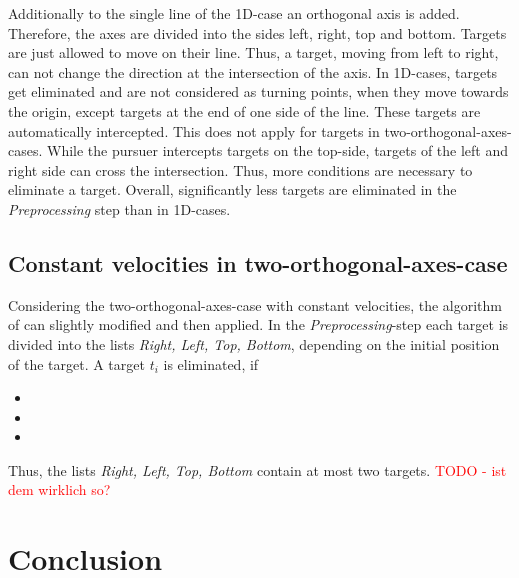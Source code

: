 \documentclass[english,version-2019-07]{uzl-thesis}
\begin{document}
Additionally to the single line of the 1D-case an orthogonal axis is added. Therefore, the axes are divided into the sides left, right, top and bottom. Targets are just allowed to move on their line. Thus, a target, moving from left to right, can not change the direction at the intersection of the axis. In 1D-cases, targets get eliminated and are not considered as turning points, when they move towards the origin, except targets at the end of one side of the line. These targets are automatically intercepted. This does not apply for targets in two-orthogonal-axes-cases. While the pursuer intercepts targets on the top-side, targets of the left and right side can cross the intersection. Thus, more conditions are necessary to eliminate a target. Overall, significantly less targets are eliminated in the \emph{Preprocessing} step than in 1D-cases.

\section{Constant velocities in two-orthogonal-axes-case}

Considering the two-orthogonal-axes-case with constant velocities, the algorithm of \cite{helvig} can slightly modified and then applied. In the \emph{Preprocessing}-step each target is divided into the lists \emph{Right, Left, Top, Bottom}, depending on the initial position of the target. A target $t_i$ is eliminated, if
\begin{itemize}
\item

\item

\item

\end{itemize}


Thus, the lists \emph{Right, Left, Top, Bottom} contain at most two targets. 
\textcolor{red}{TODO - ist dem wirklich so?}



\chapter{Conclusion}


%
\end{document}
